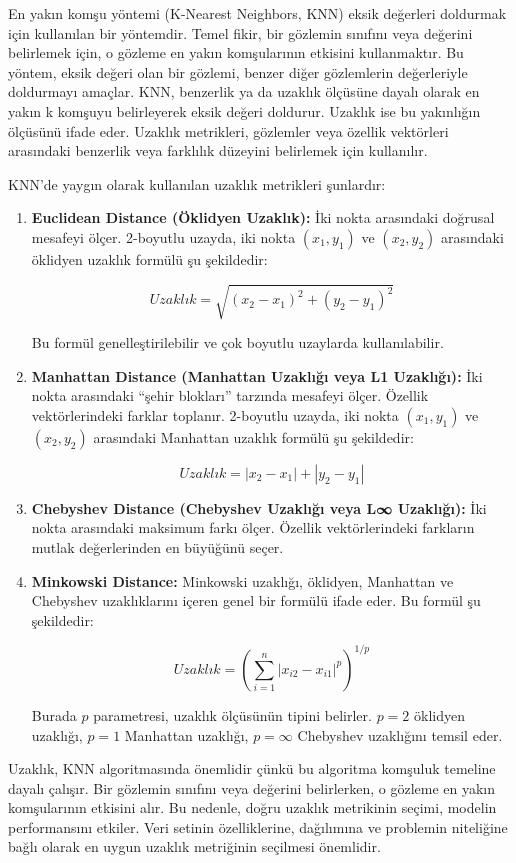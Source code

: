 \documentclass[
  letterpaper,
  DIV=11,
  numbers=noendperiod]{scrreprt}
\begin{document}
En yakın komşu yöntemi (K-Nearest Neighbors, KNN) eksik değerleri
doldurmak için kullanılan bir yöntemdir. Temel fikir, bir gözlemin
sınıfını veya değerini belirlemek için, o gözleme en yakın komşularının
etkisini kullanmaktır. Bu yöntem, eksik değeri olan bir gözlemi, benzer
diğer gözlemlerin değerleriyle doldurmayı amaçlar. KNN, benzerlik ya da
uzaklık ölçüsüne dayalı olarak en yakın k komşuyu belirleyerek eksik
değeri doldurur. Uzaklık ise bu yakınlığın ölçüsünü ifade eder. Uzaklık
metrikleri, gözlemler veya özellik vektörleri arasındaki benzerlik veya
farklılık düzeyini belirlemek için kullanılır.

KNN'de yaygın olarak kullanılan uzaklık metrikleri şunlardır:

\begin{enumerate}
\def\labelenumi{\arabic{enumi}.}
\item
  \textbf{Euclidean Distance (Öklidyen Uzaklık):} İki nokta arasındaki
  doğrusal mesafeyi ölçer. 2-boyutlu uzayda, iki nokta \((x_1,y_1)\) ve
  \((x_2,y_2)\) arasındaki öklidyen uzaklık formülü şu şekildedir:

  \[
  Uzaklık=\sqrt{(x_2-x_1)^2+(y_2-y_1)^2}
  \]

  Bu formül genelleştirilebilir ve çok boyutlu uzaylarda kullanılabilir.
\item
  \textbf{Manhattan Distance (Manhattan Uzaklığı veya L1 Uzaklığı):} İki
  nokta arasındaki ``şehir blokları'' tarzında mesafeyi ölçer. Özellik
  vektörlerindeki farklar toplanır. 2-boyutlu uzayda, iki nokta
  \((x_1,y_1)\) ve \((x_2,y_2)\) arasındaki Manhattan uzaklık formülü şu
  şekildedir:

  \[
  Uzaklık=|x_2-x_1|+|y_2-y_1|
  \]
\item
  \textbf{Chebyshev Distance (Chebyshev Uzaklığı veya L∞ Uzaklığı):} İki
  nokta arasındaki maksimum farkı ölçer. Özellik vektörlerindeki
  farkların mutlak değerlerinden en büyüğünü seçer.
\item
  \textbf{Minkowski Distance:} Minkowski uzaklığı, öklidyen, Manhattan
  ve Chebyshev uzaklıklarını içeren genel bir formülü ifade eder. Bu
  formül şu şekildedir:

  \[
  Uzaklık=(\sum_{i=1}^n |x_{i2}-x_{i1}|^p)^{1/p}
  \]

  Burada \(p\) parametresi, uzaklık ölçüsünün tipini belirler. \(p=2\)
  öklidyen uzaklığı, \(p=1\) Manhattan uzaklığı, \(p=\infty\) Chebyshev
  uzaklığını temsil eder.
\end{enumerate}

Uzaklık, KNN algoritmasında önemlidir çünkü bu algoritma komşuluk
temeline dayalı çalışır. Bir gözlemin sınıfını veya değerini
belirlerken, o gözleme en yakın komşularının etkisini alır. Bu nedenle,
doğru uzaklık metrikinin seçimi, modelin performansını etkiler. Veri
setinin özelliklerine, dağılımına ve problemin niteliğine bağlı olarak
en uygun uzaklık metriğinin seçilmesi önemlidir.
\end{document}
